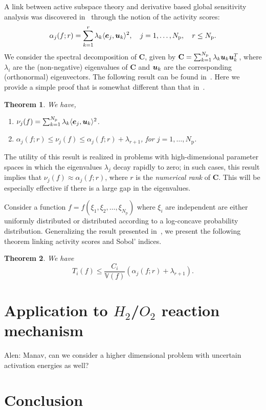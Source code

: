 \documentclass[1pt]{elsarticle}
\renewcommand{\vec}[1]{{\mathchoice
                     {\mbox{\boldmath$\displaystyle{#1}$}}
                     {\mbox{\boldmath$\textstyle{#1}$}}
                     {\mbox{\boldmath$\scriptstyle{#1}$}}
                     {\mbox{\boldmath$\scriptscriptstyle{#1}$}}}}
\newcommand{\V}{\mathbb{V}}
\newcommand{\ip}[2]{\langle{#1}, {#2}\rangle}
\newcommand{\mat}[1]{\mathbf{{#1}}}
\newcommand{\Np}{{N_\text{p}}}
\newcommand{\alennote}[1]{{\color{blue} Alen: {#1}}}
\newtheorem{theorem}{Theorem}[section]
\begin{document}
A link between active subspace theory and derivative based global sensitivity 
analysis was discovered in~\cite{Diaz16} through the notion of 
the activity scores:
\[
   \alpha_j(f; r) =  \sum_{k=1}^r \lambda_k \ip{\vec{e}_j}{\vec{u}_k}^2,
   \quad j = 1, \ldots, \Np, \quad r \leq \Np.
\]
We consider the spectral decomposition of $\mat{C}$, given by  
$\mat{C} = \sum_{k=1}^\Np \lambda_k \vec{u}_k \vec{u}_k^T$, where 
$\lambda_i$ are the (non-negative) eigenvalues of $\mat{C}$ and
$\vec{u}_k$ are the corresponding (orthonormal) eigenvectors.
The following result can be found in~\cite{Diaz16}. Here we provide
a simple proof that is somewhat different than that in~\cite{Diaz16}. 
\begin{theorem}
We have,
\begin{enumerate}
\item $\nu_j(f) = \sum_{k=1}^\Np \lambda_k \ip{\vec{e}_j}{\vec{u}_k}^2$. 
\item $\alpha_j(f; r) \leq \nu_j(f) \leq \alpha_j(f; r) + \lambda_{r+1}$, 
for $j=1, \ldots, \Np$.
\end{enumerate}
\end{theorem} 
The utility of this result is realized in 
problems with 
high-dimensional parameter spaces in which 
the eigenvalues $\lambda_j$ decay rapidly to zero; in 
such cases, this result implies that  $\nu_j(f) \approx \alpha_j(f; r)$,
where $r$ is the \emph{numerical rank} of $\mat{C}$.  This will be especially
effective if there is a large gap in the eigenvalues.  

Consider a function $f = f(\xi_1, \xi_2, \ldots, \xi_\Np)$ where
$\xi_i$ are independent are either uniformly distributed or
distributed according to a log-concave probability distribution.  
Generalizing the result presented in~\cite{Diaz16}, we present
the following theorem linking activity scores and Sobol' indices.
\begin{theorem}
We have
\[
    T_i(f) \leq \frac{C_i}{\V(f)}(\alpha_j(f; r) + \lambda_{r+1}).
\]
\end{theorem}
\section{Application to $H_2$/$O_2$ reaction mechanism}

\alennote{Manav, can we consider a higher dimensional problem with uncertain
activation energies as well?}

\section{Conclusion}
\end{document}
